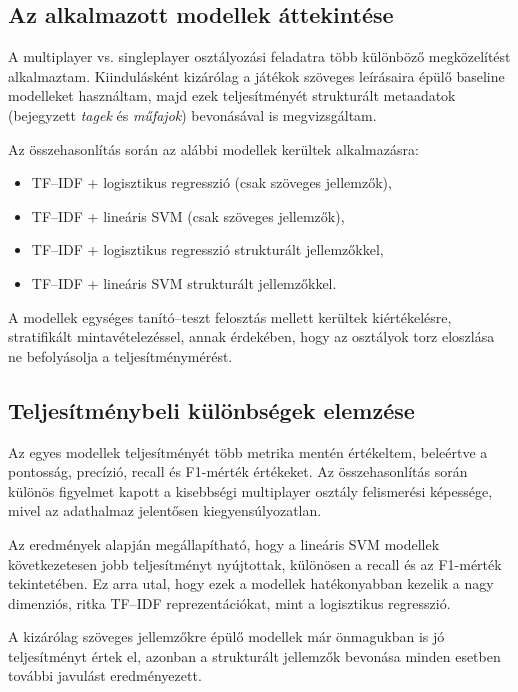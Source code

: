 
\subsection{Az alkalmazott modellek áttekintése}

A multiplayer vs. singleplayer osztályozási feladatra több különböző
megközelítést alkalmaztam.
Kiindulásként kizárólag a játékok szöveges leírásaira épülő
baseline modelleket használtam,
majd ezek teljesítményét strukturált metaadatok
(bejegyzett \textit{tagek} és \textit{műfajok}) bevonásával is megvizsgáltam.

Az összehasonlítás során az alábbi modellek kerültek alkalmazásra:
\begin{itemize}
    \item TF--IDF \cite{tf-idf} + logisztikus regresszió \cite{logistic regression} (csak szöveges jellemzők),
    \item TF--IDF + lineáris SVM \cite{svm} (csak szöveges jellemzők),
    \item TF--IDF + logisztikus regresszió strukturált jellemzőkkel,
    \item TF--IDF + lineáris SVM strukturált jellemzőkkel.
\end{itemize}

A modellek egységes tanító--teszt felosztás mellett kerültek kiértékelésre,
stratifikált mintavételezéssel,
annak érdekében, hogy az osztályok torz eloszlása
ne befolyásolja a teljesítménymérést.

\subsection{Teljesítménybeli különbségek elemzése}

Az egyes modellek teljesítményét több metrika mentén értékeltem,
beleértve a pontosság, precízió, recall és F1-mérték \cite{metrics} értékeket.
Az összehasonlítás során különös figyelmet kapott
a kisebbségi multiplayer osztály felismerési képessége,
mivel az adathalmaz jelentősen kiegyensúlyozatlan.

Az eredmények alapján megállapítható,
hogy a lineáris SVM \cite{svm} modellek következetesen jobb teljesítményt nyújtottak,
különösen a recall és az F1-mérték tekintetében.
Ez arra utal, hogy ezek a modellek hatékonyabban kezelik
a nagy dimenziós, ritka TF--IDF \cite{tf-idf} reprezentációkat,
mint a logisztikus regresszió.

A kizárólag szöveges jellemzőkre épülő modellek
már önmagukban is jó teljesítményt értek el,
azonban a strukturált jellemzők bevonása
minden esetben további javulást eredményezett.

